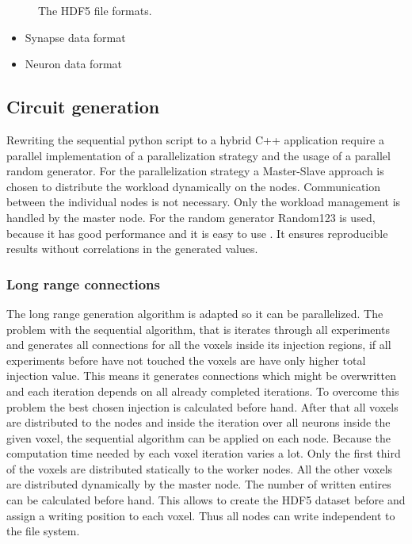 \documentclass[a4paper]{article}
\begin{document}
\begin{figure}[ht!]
\begin{center}
{       }
    	   \end{center}
    	\caption{%
        The HDF5 file formats.
     }%
   \label{fig:atlas}
   \end{figure}

\begin{itemize}
      \item Synapse data format
      \item Neuron data format
\end{itemize}

\newpage
\subsection{Circuit generation}
Rewriting the sequential python script to a hybrid C++ application require a parallel implementation of a parallelization strategy and the usage of 
a parallel random generator. For the parallelization strategy a Master-Slave approach is chosen to distribute the workload dynamically on the nodes.
Communication between the individual nodes is not necessary. Only the workload management is handled by the master node.
For the random generator Random123 is used, because it has good performance and it is easy to use \cite{salmon2011parallel}.
It ensures reproducible results without correlations in the generated values. 


\subsubsection{Long range connections}

The long range generation algorithm is adapted so it can be parallelized.
The problem with the sequential algorithm, that is iterates through all experiments
and generates all connections for all the voxels inside its injection regions, if 
all experiments before have not touched the voxels are have only higher total injection
value. This means it generates connections which might be overwritten and each iteration depends 
on all already completed iterations. To overcome this problem the best chosen injection is calculated before hand.
After that all voxels are distributed to the nodes and inside the iteration over all neurons
inside the given voxel, the sequential algorithm can be applied on each node.
Because the computation time needed by each voxel iteration varies a lot. Only the first third
of the voxels are distributed statically to the worker nodes.
All the other voxels are distributed dynamically by the master node.
The number of written entires can be calculated before hand. This allows to create
the HDF5 dataset before and assign a writing position to each voxel.
Thus all nodes can write independent to the file system.
\end{document}
